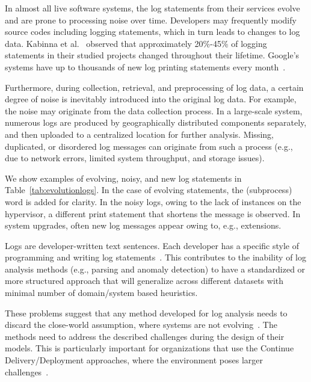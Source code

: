 In almost all live software systems, the log statements from their services evolve and are prone to processing noise over time. Developers may frequently modify source codes including logging statements, which in turn leads to changes to log data. Kabinna et al.~\cite{kabinna2018examining} observed that approximately 20\%-45\% of logging statements in their studied projects changed throughout their lifetime. Google’s systems have up to thousands of new log printing statements every month~\cite{xu2010system}. 

Furthermore, during collection, retrieval, and preprocessing of log data, a certain degree of noise is inevitably introduced into the original log data. For example, the noise may originate from the data collection process. In a large-scale system, numerous logs are produced by geographically distributed components separately, and then uploaded to a centralized location for further analysis. Missing, duplicated, or disordered log messages can originate from such a process (e.g., due to network errors, limited
system throughput, and storage issues).

We show examples of evolving, noisy, and new log statements in Table~\ref{tab:evolutionlogs}. In the case of evolving statements, the (subprocess) word is added for clarity. In the noisy logs, owing to the lack of instances on the hypervisor, a different print statement that shortens the message is observed. In system upgrades, often new log messages appear owing to, e.g., extensions. 

Logs are developer-written text sentences. Each developer has a specific style of programming and writing log statements~\cite{zhu2019tools}. This contributes to the inability of log analysis methods (e.g., parsing and anomaly detection) to have a standardized or more structured approach that will generalize across different datasets with minimal number of domain/system based heuristics.

These problems suggest that any method developed for log analysis needs to discard the close-world assumption, where systems are not evolving~\cite{du2019lifelong,du2017deeplog}. The methods need to address the described challenges during the design of their models. This is particularly important for organizations that use the Continue Delivery/Deployment approaches, where the environment poses larger challenges~\cite{chen2015continuous}.

